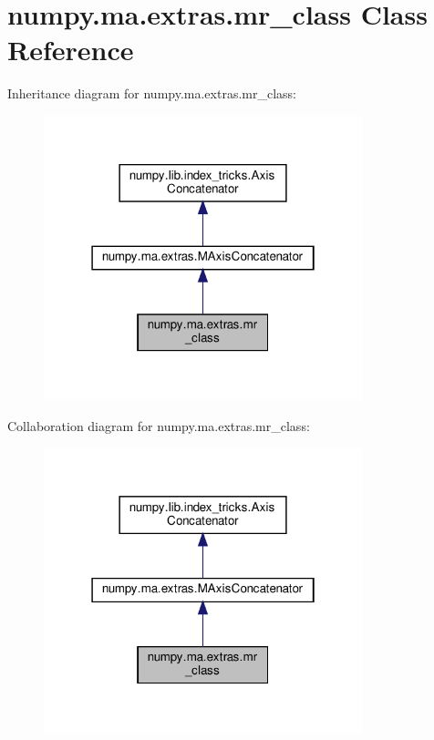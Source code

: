 \hypertarget{classnumpy_1_1ma_1_1extras_1_1mr__class}{}\section{numpy.\+ma.\+extras.\+mr\+\_\+class Class Reference}
\label{classnumpy_1_1ma_1_1extras_1_1mr__class}


Inheritance diagram for numpy.\+ma.\+extras.\+mr\+\_\+class\+:
\nopagebreak
\begin{figure}[H]
\begin{center}
\leavevmode
\includegraphics[width=262pt]{classnumpy_1_1ma_1_1extras_1_1mr__class__inherit__graph}
\end{center}
\end{figure}


Collaboration diagram for numpy.\+ma.\+extras.\+mr\+\_\+class\+:
\nopagebreak
\begin{figure}[H]
\begin{center}
\leavevmode
\includegraphics[width=262pt]{classnumpy_1_1ma_1_1extras_1_1mr__class__coll__graph}
\end{center}
\end{figure}
